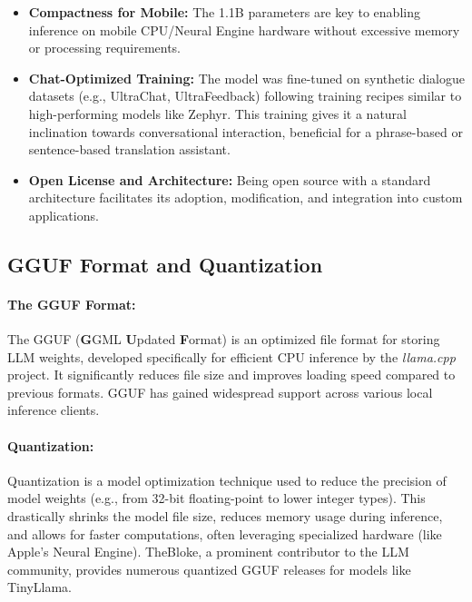 \documentclass[12pt]{article}
\begin{document}
\begin{itemize}
    \item \textbf{Compactness for Mobile:} The 1.1B parameters are key to enabling inference on mobile CPU/Neural Engine hardware without excessive memory or processing requirements.
    \item \textbf{Chat-Optimized Training:} The model was fine-tuned on synthetic dialogue datasets (e.g., UltraChat, UltraFeedback) following training recipes similar to high-performing models like Zephyr. This training gives it a natural inclination towards conversational interaction, beneficial for a phrase-based or sentence-based translation assistant.
    \item \textbf{Open License and Architecture:} Being open source with a standard architecture facilitates its adoption, modification, and integration into custom applications.
\end{itemize}

\subsection{GGUF Format and Quantization}

\paragraph{The GGUF Format:}
The GGUF (\textbf{G}GML \textbf{U}pdated \textbf{F}ormat) is an optimized file format for storing LLM weights, developed specifically for efficient CPU inference by the \emph{llama.cpp} project. It significantly reduces file size and improves loading speed compared to previous formats. GGUF has gained widespread support across various local inference clients.

\paragraph{Quantization:} %
Quantization is a model optimization technique used to reduce the precision of model weights (e.g., from 32-bit floating-point to lower integer types). This drastically shrinks the model file size, reduces memory usage during inference, and allows for faster computations, often leveraging specialized hardware (like Apple's Neural Engine). TheBloke, a prominent contributor to the LLM community, provides numerous quantized GGUF releases for models like TinyLlama.
\end{document}
